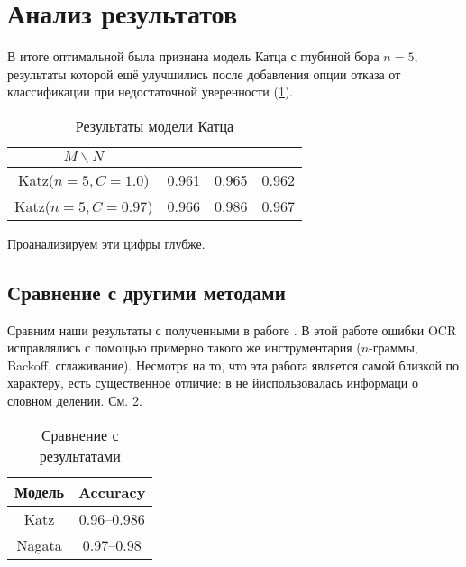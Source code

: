 
\section{ Анализ результатов }\label{sec:analysis}

В итоге оптимальной была признана модель Катца с глубиной бора $n=5$, результаты которой ещё улучшились после добавления опции отказа от классификации при недостаточной уверенности (\cref{table:katzres}).

\begin{table}[H]
	\begin{center}

\begin{tabular}{|c|c|c|c|}\hline
	$M \backslash N$ & \KG & \BS & \MX \\ \hline
	Katz($n=5, C=1.0$)			 & 0.961 & 0.965 & 0.962 \\
	Katz($n=5, C=0.97$)	 & 0.966  & 0.986 & 0.967 \\ \hline 	
\end{tabular}
\caption{Результаты модели Катца}
\label{table:katzres}
\end{center}
\end{table}

Проанализируем эти цифры глубже.

\subsection{ Сравнение с другими методами }

Сравним наши результаты с полученными в работе \cite{nagata:shape}. В этой работе ошибки OCR исправлялись с помощью примерно такого же инструментария ($n$-граммы, Backoff, сглаживание). Несмотря на то, что эта работа является самой близкой по характеру, есть существенное отличие: в не йиспользовалась информаци о словном делении. См. \cref{table:nagres}.

\begin{table}[H]
	\begin{center}

\begin{tabular}{|c|c|}\hline
	Модель & Accuracy \\ \hline
	Katz			 &  0.96--0.986 \\
	Nagata & 0.97--0.98 \\ \hline 	
\end{tabular}
\caption{Сравнение с результатами \cite{nagata:shape}}
\label{table:nagres}
\end{center}
\end{table}

